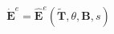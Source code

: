 \documentclass[preview]{standalone}
\begin{document}
\begin{align*}
\dot{\mathbf{E}}^e = \hat{\mathbf{E}}^e(\tilde{\mathbf{T}}, \theta, \mathbf{B}, s)
\end{align*}
\end{document}
